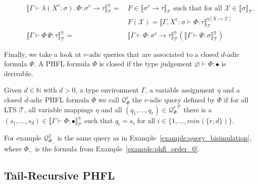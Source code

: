 \begin{figure}
\begin{align*}
        \llbracket \Gamma \vdash \lambda (X^v \colon \sigma).\,\Phi \colon \sigma^v \rightarrow \tau \rrbracket
        ^\eta_\mathcal{T} =\,& F \in \llbracket \sigma^v \rightarrow \tau \rrbracket_\mathcal{T} \text{ such that for
        all }
        \mathcal{X} \in \llbracket \sigma \rrbracket_\mathcal{T}.\, \\
        &F(\mathcal{X}) = \llbracket \Gamma, X^v \colon \sigma \vdash \Phi \colon \tau \rrbracket^{\eta[X \mapsto
        \mathcal{X}]}_\mathcal{T}\\
        \llbracket \Gamma \vdash \Phi\,\Psi \colon \tau \rrbracket^\eta_\mathcal{T} =\,& \llbracket \Gamma \vdash \Phi
        \colon \sigma
        ^v \rightarrow \tau \rrbracket ^\eta_\mathcal{T}(\llbracket \Gamma \vdash \Psi \colon \sigma \rrbracket ^\eta_\mathcal{T})
    \end{align*}
\end{figure}

Finally, we take a look at $r$-adic queries that are associated to a
closed $d$-adic formula $\Phi$. A PHFL formula $\Phi$ is closed if the type judgement $\varnothing \vdash \Phi \colon \bullet$ is derivable.

\begin{definition}
\label{definition:query_associated_to_formula}
    Given $d \in \mathbb{N}$ with $d > 0$, a type environment $\Gamma$, a variable assignment $\eta$ and a closed $d$-adic PHFL
    formula $\Phi$ we call $\mathcal{Q}^r_\Phi$ the $r$-adic query defined by $\Phi$ if for all LTS
    $\mathcal{T}$, all variable mappings $\eta$ and all $(q_1, \dots, q_r) \in {\mathcal{Q}^r_\Phi}^\mathcal{T}$ there is a $(s_1, \dots, s_d) \in
    \llbracket \Gamma \vdash \Phi \colon \bullet \rrbracket^\eta_\mathcal{T}$ such that $q_i = s_i$ for all $i \in
    \{1, \dots, min(\{r, d\})\}$.
\end{definition}

For example $\mathcal{Q}^2_{\Phi_\sim}$ is the same query as in Example~\ref{example:query_bisimulation}, where
$\Phi_\sim$ is the formula from Example~\ref{example:phfl_order_0}.

\subsection{Tail-Recursive PHFL}\label{subsec:tail-recursivePhfl}


